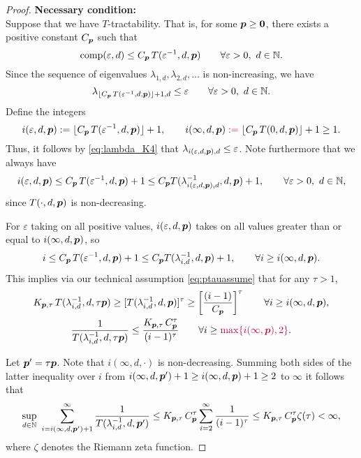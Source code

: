\documentclass[11pt,a4paper]{article}
\newcommand{\peter}[1]{\begingroup\color{purple}#1\endgroup}
\begin{document}
\begin{proof}
\bigskip

\noindent \textbf{Necessary condition:}\\
Suppose that we have
$T$-tractability. That is, for some $\boldsymbol{p} \ge \boldsymbol{0}$, there exists a positive constant $C_{\boldsymbol{p}}$ such that
\[
\operatorname{comp}(\varepsilon,d)\le C_{\boldsymbol{p}}\, T(\varepsilon^{-1},d,\boldsymbol{p}) \qquad \forall \varepsilon > 0,  \ d \in \mathbb{N}.
\]
Since the sequence of eigenvalues $\lambda_{1,d}, \lambda_{2,d}, \ldots $ is non-increasing, we have
\begin{equation}\label{eq:lambda_K4}
	\lambda_{\lfloor C_{\boldsymbol{p}}\, T(\varepsilon^{-1},d,\boldsymbol{p})\rfloor +1,d}\le \varepsilon \qquad \forall \varepsilon > 0,  \ d \in \mathbb{N}.
\end{equation}
Define the integers
\[
i (\varepsilon,d,\vp):= \lfloor C_{\vp}\, T(\varepsilon^{-1},d,\vp)\rfloor +1, \qquad
i (\infty,d,\vp) \peter{:=} \lfloor C_{\vp}\, T(0,d,\vp)\rfloor +1 \ge 1.
\]
Thus, it follows by \eqref{eq:lambda_K4} that $\lambda_{i(\varepsilon,d,\boldsymbol{p}),d} \le \varepsilon$.
Note furthermore that we always have
\[
i(\varepsilon,d,\boldsymbol{p})\le C_{\boldsymbol{p}}\, T(\varepsilon^{-1},d,\boldsymbol{p})+1 \le C_{\boldsymbol{p}} T(\lambda_{i(\varepsilon,d,\boldsymbol{p}),d}^{-1},d,\boldsymbol{p})+1, \qquad \forall \varepsilon > 0, \ d \in \mathbb{N},
\]
since
$T(\cdot,d,\boldsymbol{p})$ is non-decreasing.

For $\varepsilon$ taking on all positive values, $i(\varepsilon,d,\boldsymbol{p})$ takes on all values greater than or equal to $i(\infty,d,\boldsymbol{p})$, so
\[
i\le C_{\boldsymbol{p}}\, T(\varepsilon^{-1},d,\boldsymbol{p})+1 \le C_{\boldsymbol{p}} T(\lambda_{i,d}^{-1},d,\boldsymbol{p})+1, \qquad \forall i \ge i(\infty,d,\boldsymbol{p}).
\]
This implies via our technical assumption \eqref{eq:ptauassume} that for any $\tau > 1$,
\begin{gather*}
	K_{\vp,\tau}\,T (\lambda_{i,d}^{-1},d,\tau \vp) \ge
	[T(\lambda_{i,d}^{-1},d, \vp)]^\tau
	\ge
	\left[\frac{(i-1)}{C_{\vp}}\right]^\tau \qquad \forall i \ge i(\infty,d,\vp), \\
	 \frac{1}{T (\lambda_{i,d}^{-1},d,\tau \vp)} \le
	\frac{K_{\vp,\tau}\, C_{\vp}^\tau}{(i-1)^\tau}\qquad \forall i \ge \peter{\max\{i(\infty,\vp),2\}}.
\end{gather*}

Let $\boldsymbol{p}' = \tau \boldsymbol{p}$.  Note that $i(\infty,d,\cdot)$ is non-decreasing.  Summing both sides of the \peter{latter} inequality over $i$ from $i(\infty,d,\boldsymbol{p}') + 1 \ge i(\infty,d, \boldsymbol{p}) + 1 \ge 2$ to $\infty$ it follows that
\begin{equation*}
	\sup_{d\in\mathbb{N}} \, \, \sum_{i=i (\infty,d,\boldsymbol{p}')+1}^\infty \frac{1}{T (\lambda_{i,d}^{-1},d,\boldsymbol{p}')}
	 \le  K_{\boldsymbol{p},\tau}\, C_{\boldsymbol{p}}^\tau
	\sum_{i=2}^\infty \frac{1}{(i-1)^\tau} \\
	 \le  K_{\boldsymbol{p},\tau}\, C_{\boldsymbol{p}}^\tau
	\zeta (\tau)  < \infty,
\end{equation*}
where $\zeta$ denotes the Riemann zeta function.



\end{proof}
\end{document}
